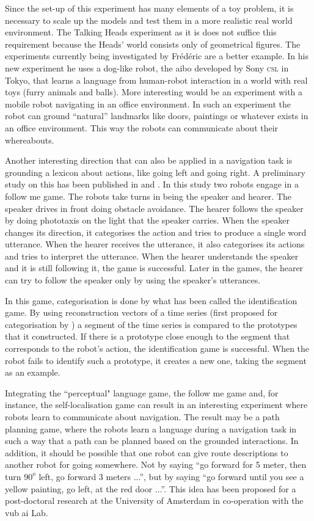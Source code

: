 Since the set-up of this experiment has many elements of a toy problem, it is necessary to scale up the models and test them in a more realistic real world environment. The Talking Heads experiment as it is does not suffice this requirement because the Heads' world consists only of geometrical figures. The experiments currently being investigated by Fr\'ed\'eric \citet{kaplan:2000} are a better example. In his new experiment he uses a dog-like robot, the {\sc aibo} developed by Sony {\scshape csl} in Tokyo, that learns a language from human-robot interaction in a world with real toys (furry animals and balls). More interesting would be an experiment with a mobile robot navigating in an office environment. In such an experiment the robot can ground ``natural'' landmarks like doors, paintings or whatever exists in an office environment. This way the robots can communicate about their whereabouts.

Another interesting direction that can also be applied in a navigation task is grounding a lexicon about actions, like going left and going right. A preliminary study on this has been published in \citet{vogt:1999a} and \citet{vogt:2000}. In this study two robots engage in a {\sc follow me game}. The robots take turns in being the speaker and hearer. The speaker drives in front doing obstacle avoidance. The hearer follows the speaker by doing phototaxis on the light that the speaker carries. When the speaker changes its direction, it categorises the action and tries to produce a single word utterance. When the hearer receives the utterance, it also categorises its actions and tries to interpret the utterance. When the hearer understands the speaker and it is still following it, the game is successful. Later in the games, the hearer can try to follow the speaker only by using the speaker's utterances.

In this game, categorisation is done by what has been called the {\sc identification game}. By using reconstruction vectors of a time series (first proposed for categorisation by \citealt{rosenstein:1998a}) a segment of the time series is compared to the prototypes that it constructed. If there is a prototype close enough to the segment that corresponds to the robot's action, the identification game is successful. When the robot fails to identify such a prototype, it creates a new one, taking the segment as an example.

Integrating the ``perceptual" language game, the follow me game and, for instance, the self-localisation game can result in an interesting experiment where robots learn to communicate about navigation. The result may be a {\sc path planning game}, where the robots learn a language during a navigation task in such a way that a path can be planned based on the grounded interactions. In addition, it should be possible that one robot can give route descriptions to another robot for going somewhere. Not by saying ``go forward for 5 meter, then turn $90^o$ left, go forward 3 meters ...'', but by saying ``go forward until you see a yellow painting, go left, at the red door ...''. This idea has been proposed for a post-doctoral research at the University of Amsterdam in co-operation with the {\sc vub ai} Lab.

